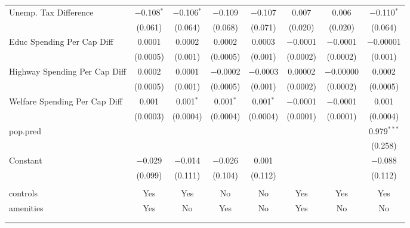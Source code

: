 \begin{table}[!htbp]
\begin{tabular}{@{\extracolsep{5pt}}lccccccc}
  Unemp. Tax Difference & $-$0.108$^{*}$ & $-$0.106$^{*}$ & $-$0.109 & $-$0.107 & 0.007 & 0.006 & $-$0.110$^{*}$ \\ 
  & (0.061) & (0.064) & (0.068) & (0.071) & (0.020) & (0.020) & (0.064) \\ 
  Educ Spending Per Cap Diff & 0.0001 & 0.0002 & 0.0002 & 0.0003 & $-$0.0001 & $-$0.0001 & $-$0.00001 \\ 
  & (0.0005) & (0.001) & (0.0005) & (0.001) & (0.0002) & (0.0002) & (0.001) \\ 
  Highway Spending Per Cap Diff & 0.0002 & 0.0001 & $-$0.0002 & $-$0.0003 & 0.00002 & $-$0.00000 & 0.0002 \\ 
  & (0.0005) & (0.001) & (0.0005) & (0.001) & (0.0002) & (0.0002) & (0.0005) \\ 
  Welfare Spending Per Cap Diff & 0.001 & 0.001$^{*}$ & 0.001$^{*}$ & 0.001$^{*}$ & $-$0.0001 & $-$0.0001 & 0.001 \\ 
  & (0.0003) & (0.0004) & (0.0004) & (0.0004) & (0.0001) & (0.0001) & (0.0004) \\ 
  pop.pred &  &  &  &  &  &  & 0.979$^{***}$ \\ 
  &  &  &  &  &  &  & (0.258) \\ 
  Constant & $-$0.029 & $-$0.014 & $-$0.026 & 0.001 &  &  & $-$0.088 \\ 
  & (0.099) & (0.111) & (0.104) & (0.112) &  &  & (0.112) \\ 
 \hline \\[-1.8ex] 
controls & Yes & Yes & No & No & Yes & Yes & Yes \\ 
amenities & Yes & No & Yes & No & Yes & No & No \\ 
\hline \\[-1.8ex] 
\hline 
\hline \\[-1.8ex] 
\end{tabular} 
\end{table} 
